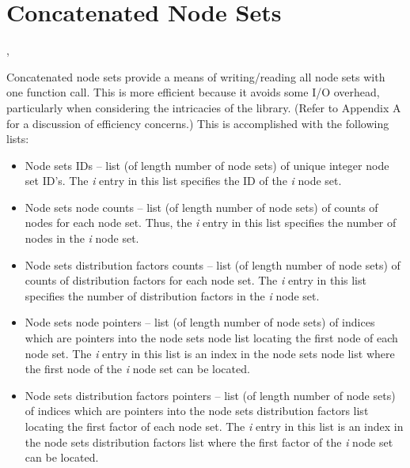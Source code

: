 \section{Concatenated Node Sets}

\begin{spacing}{1.5}
\api {}, 
\end{spacing}

Concatenated node sets provide a means of writing/reading all node
sets with one function call. This is more efficient because it avoids
some I/O overhead, particularly when considering the intricacies of
the  library. (Refer to Appendix A for a discussion of
efficiency concerns.) This is accomplished with the following lists:

\begin{itemize}

 \item Node sets IDs -- list (of length number of node sets) 
of unique integer node set ID's. The \textit{{i}}\th{} entry in 
this list specifies the ID of the \textit{{i}}\th{} node set.

 \item Node sets node counts -- list (of length number of 
node sets) of counts of nodes for each node set. Thus, the \textit{{i}}\th{} 
entry in this list specifies the number of nodes in the \textit{{i}}\th{} 
node set.

 \item Node sets distribution factors counts -- list (of 
length number of node sets) of counts of distribution factors 
for each node set. The \textit{{i}}\th{} entry in this list specifies 
the number of distribution factors in the \textit{{i}}\th{} node 
set.

 \item Node sets node pointers -- list (of length number 
of node sets) of indices which are pointers into the node sets 
node list locating the first node of each node set. The \textit{{i}}\th{} 
entry in this list is an index in the node sets node list where 
the first node of the \textit{{i}}\th{} node set can be located.

 \item Node sets distribution factors pointers -- list (of 
length number of node sets) of indices which are pointers into 
the node sets distribution factors list locating the first factor 
of each node set. The \textit{{i}}\th{} entry in this list is an 
index in the node sets distribution factors list where the first 
factor of the \textit{{i}}\th{} node set can be located.


\end{itemize}
